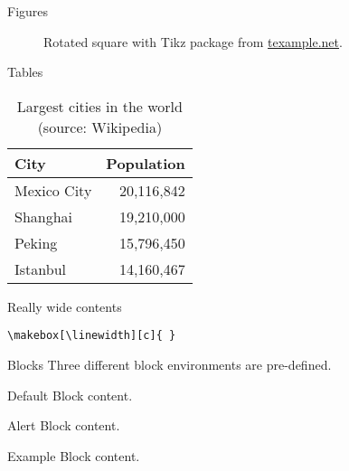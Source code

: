 \documentclass[aspectratio=169]{beamer}
\begin{document}
	\begin{frame}{Figures}
		\begin{figure}
			\centering
			\setcounter{density}{20}
			\caption{Rotated square with Tikz package from
			\href{http://www.texample.net/tikz/examples/rotated-polygons/}{texample.net}.}
		\end{figure}
	\end{frame}
	
	\begin{frame}{Tables}
		\begin{table}
			\centering
			\caption{Largest cities in the world (source: Wikipedia)}
			\begin{tabular}{@{} lr @{}}
				\toprule
				City & Population\\
				\midrule
				Mexico City & 20,116,842\\
				Shanghai & 19,210,000\\
				Peking & 15,796,450\\
				Istanbul & 14,160,467\\
				\bottomrule
			\end{tabular}
		\end{table}
	\end{frame}

	\begin{frame}[fragile]{Really wide contents}
		
		\verb|\makebox[\linewidth][c]{ }|
	\end{frame}
		
	\begin{frame}{Blocks}
		Three different block environments are pre-defined.
		
		\begin{block}{Default}
			Block content.
		\end{block}
		
		\begin{alertblock}{Alert}
			Block content.
		\end{alertblock}
		
		\begin{exampleblock}{Example}
			Block content.
		\end{exampleblock}
	\end{frame}
	
\end{document}
